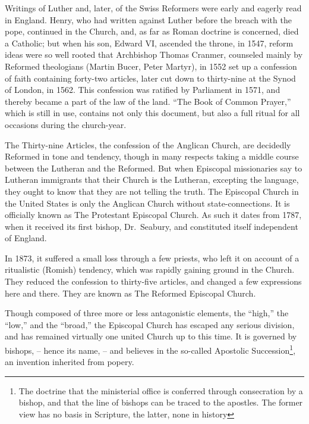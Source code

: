 \documentclass[
]{book}
\begin{document}
Writings of Luther and, later, of the Swiss Reformers were early and eagerly read in England. Henry, who had written against Luther before the breach with the pope, continued in the Church, and, as far as Roman doctrine is concerned, died a Catholic; but when his son, Edward VI, ascended the throne, in 1547, reform ideas were so well rooted that Archbishop Thomas Cranmer, counseled mainly by Reformed theologians (Martin Bucer, Peter Martyr), in 1552 set up a confession of faith containing forty-two articles, later cut down to thirty-nine at the Synod of London, in 1562. This confession was ratified by Parliament in 1571, and thereby became a part of the law of the land. ``The Book of Common Prayer,'' which is still in use, contains not only this document, but also a full ritual for all occasions during the church-year.

The Thirty-nine Articles, the confession of the Anglican Church, are decidedly Reformed in tone and tendency, though in many respects taking a middle course between the Lutheran and the Reformed. But when Episcopal missionaries say to Lutheran immigrants that their Church is the Lutheran, excepting the language, they ought to know that they are not telling the truth. The Episcopal Church in the United States is only the Anglican Church without state-connections. It is officially known as The Protestant Episcopal Church. As such it dates from 1787, when it received its first bishop, Dr.~Seabury, and constituted itself independent of England.

In 1873, it suffered a small loss through a few priests, who left it on account of a ritualistic (Romish) tendency, which was rapidly gaining ground in the Church. They reduced the confession to thirty-five articles, and changed a few expressions here and there. They are known as The Reformed Episcopal Church.

Though composed of three more or less antagonistic elements, the ``high,'' the ``low,'' and the ``broad,'' the Episcopal Church has escaped any serious division, and has remained virtually one united Church up to this time. It is governed by bishops, -- hence its name, -- and believes in the so-called Apostolic Succession\footnote{The doctrine that the ministerial office is conferred through consecration by a bishop, and that the line of bishops can be traced to the apostles. The former view has no basis in Scripture, the latter, none in history}, an invention inherited from popery.
\end{document}
